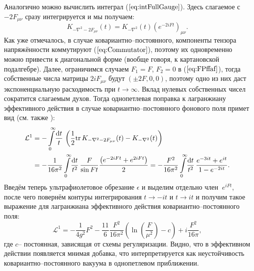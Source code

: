%

Аналогично можно вычислить интеграл ($\ref{eq:intFullGauge}$). Здесь слагаемое с $-2F_{\mu \nu}$ сразу интегрируется и мы получаем:
\begin{equation*}
	K_{-\nabla^2-2F_{\mu \nu}}(t)=K_{-\nabla^2}(t)\left( e^{-2iFt} \right)_{\mu \nu}.
\end{equation*}
Как уже отмечалось, в случае ковариантно--постоянного, компоненты тензора напряжённости коммутируют ($\ref{eq:Commutator}$), поэтому их одновременно можно привести к диагональной форме (вообще говоря, к картановской подалгебре). Далее, ограничимся случаем $F_1=F$, $F_2=0$ в ($\ref{eq:FPffaf}$), тогда собственные числа матрицы $2iF_{\mu \nu}$ будут $(\pm 2 F,0,0)$, поэтому одно из них даст экспоненциальную расходимость при $t\to \infty$. Вклад нулевых собственных чисел сократится слагаемым духов. Тогда однопетлевая поправка к лагранжиану эффективного действия в случае ковариантно--постоянного фонового поля примет вид (см. также  \cite{Kennaway2004}):
\begin{equation*}
	\begin{split}
		\mathcal{L}^{1}&=-\int\limits_0^\infty\!\frac{\mathrm{d} t}{t}\, \left( \frac12 \mathrm{tr} \,K_{-\nabla^2-2F_{\mu \nu}}(t) -  K_{-\nabla^2}(t) \right)\\
		&=-\frac{1}{16\pi^2}\int\limits_0^\infty\!\frac{\mathrm{d} t}{t^2}\, \frac{F}{\sin{Ft}}\frac{\left( e^{-2iFt}+e^{2iFt} \right)}{2} =-\frac{F^2}{16\pi^2}\int\limits_0^\infty\!\frac{\mathrm{d} t}{t^2}\, \frac{e^{-3it}+e^{it}}{1-
e^{-2it}}.
	\end{split}
\end{equation*}
Введём теперь ультрафиолетовое обрезание $\epsilon$ и выделим отдельно член $~e^{iFt}$, после чего повернём контуры интегрирования $t\to -it$ и $t\to it$ и получим такое выражение для лагранжиана эффективного действия ковариантно--постоянного поля:
\begin{equation}
	\label{eq:EffLagrangianCovarConst}
	\mathcal{L}^1=-\frac{1}{4g^2}F^2 - \frac{11}{6}\frac{F^2}{16\pi^2}\left(\ln\left(\frac{F}{\mu^2}\right) - c\right)+ i \frac{F^2}{16\pi},
\end{equation}
где $c$-- постоянная, зависящая от схемы регуляризации. Видно, что в эффективном действии появляется мнимая добавка, что интерпретируется как неустойчивость ковариантно--постоянного вакуума в однопетлевом приближении.